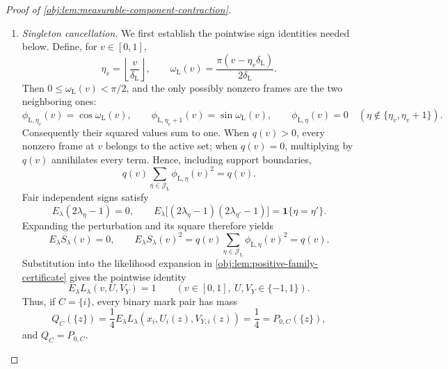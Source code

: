 \begin{proof}[Proof of \cref{obj:lem:measurable-component-contraction}]
\begin{enumerate}
Distinct components have disjoint sign sets:
\[
C,C'\in\mathscr C(x),\ C\ne C'
\quad\Longrightarrow\quad
J_C(x)\cap J_{C'}(x)=\varnothing.
\]
Indeed, a common sign would be used by a vertex in each component and would join them by an edge. Since the signs are independent and fair, summing separately over these disjoint sign blocks gives
\[
E_\lambda\prod_{i=1}^n
 \frac{L_\lambda(x_i,U_i(z),V_{Y,i}(z))}{4}
=
\prod_{C\in\mathscr C(x)}
 E_\lambda\prod_{i\in C}
 \frac{L_\lambda(x_i,U_i(z),V_{Y,i}(z))}{4}
=
\prod_{C\in\mathscr C(x)}Q_C(\{z|_C\}).
\]
Unused signs average to one. The component vertex sets partition the record indices, so
\[
4^{-n}
=
\prod_{C\in\mathscr C(x)}4^{-|C|}
=
\prod_{C\in\mathscr C(x)}P_{0,C}(\{z|_C\}).
\]
Both identities also hold for \(n=0\), with empty products equal to one.

\item \textit{Singleton cancellation.}
We first establish the pointwise sign identities needed below. Define, for \(v\in[0,1]\),
\[
\eta_v=\left\lfloor\frac{v}{\delta_{\mathrm L}}\right\rfloor,
\qquad
\omega_{\mathrm L}(v)
=\frac{\pi(v-\eta_v\delta_{\mathrm L})}{2\delta_{\mathrm L}}.
\]
Then \(0\le\omega_{\mathrm L}(v)<\pi/2\), and the only possibly nonzero frames are the two neighboring ones:
\[
\phi_{\mathrm L,\eta_v}(v)=\cos\omega_{\mathrm L}(v),
\qquad
\phi_{\mathrm L,\eta_v+1}(v)=\sin\omega_{\mathrm L}(v),
\qquad
\phi_{\mathrm L,\eta}(v)=0
\quad(\eta\notin\{\eta_v,\eta_v+1\}).
\]
Consequently their squared values sum to one. When \(q(v)>0\), every nonzero frame at \(v\) belongs to the active set; when \(q(v)=0\), multiplying by \(q(v)\) annihilates every term. Hence, including support boundaries,
\[
q(v)\sum_{\eta\in\mathcal J_{\mathrm L}}
 \phi_{\mathrm L,\eta}(v)^2=q(v).
\]
Fair independent signs satisfy
\[
E_\lambda(2\lambda_\eta-1)=0,
\qquad
E_\lambda\bigl[(2\lambda_\eta-1)(2\lambda_{\eta'}-1)\bigr]
=\mathbf 1\{\eta=\eta'\}.
\]
Expanding the perturbation and its square therefore yields
\[
E_\lambda S_\lambda(v)=0,
\qquad
E_\lambda S_\lambda(v)^2
=
q(v)\sum_{\eta\in\mathcal J_{\mathrm L}}\phi_{\mathrm L,\eta}(v)^2
=q(v).
\]
Substitution into the likelihood expansion in
\cref{obj:lem:positive-family-certificate} gives the pointwise identity
\[
E_\lambda L_\lambda(v,U,V_Y)=1
\qquad
(v\in[0,1],\ U,V_Y\in\{-1,1\}).
\]
Thus, if \(C=\{i\}\), every binary mark pair has mass
\[
Q_C(\{z\})
=\frac14E_\lambda L_\lambda(x_i,U_i(z),V_{Y,i}(z))
=\frac14
=P_{0,C}(\{z\}),
\]
and \(Q_C=P_{0,C}\).


\end{enumerate}
\end{proof}
